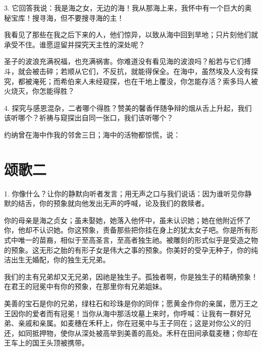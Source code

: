 3. 它回答我说：我是海之女，无边的海！我从那海上来，我怀中有一个巨大的奥秘宝库！搜寻海，但不要搜寻海的主！\par

我看见了那些在我之后下来的人，他们惊异，以致从海中回到旱地；只片刻他们就承受不住。谁愿逗留并探究天主性的深处呢？\par

圣子的波浪充满祝福，也充满祸害。你难道没有看见海的波浪吗？船若与它们搏斗，就会被击碎；若顺从它们，不反抗，就能得保全。在海中，虽然埃及人没有探究，都被淹死；而希伯来人未经窥探，也在干地上覆没，你怎能存活？索多玛人被火烧灭，你怎能得胜？\par

\par

4. 探究与感恩混杂，二者哪个得胜？赞美的馨香伴随争辩的烟从舌上升起，我们该听哪个？祈祷与窥探出自同一张口，我们该听哪个？\par

约纳曾在海中作我的邻舍三日；海中的活物都惊慌，说：\par


\section{颂歌二}

1. 你像什么？让你的静默向听者发言；用无声之口与我们说话：因为谁听见你静默的结舌，你的预象就向他发出无声的呼喊，论及我们的救赎者。\par

你的母亲是海之贞女；虽未娶她，她落入他怀中，虽未认识她；她在他附近怀了你，他却不认识她。你这预象，责备那些把你挂在身上的犹太女子吧。你是所有形式中唯一的苗裔，相似于至高圣言，至高者独生祂。被雕刻的形式似乎是受造之物的预象。这无形之胎的有形子女是伟大之事的预象。你美好的受孕无种子，你的纯洁出生无婚配，你的独生无兄弟。\par

我们的主有兄弟却又无兄弟，因祂是独生子。孤独者啊，你是独生子的精确预象！在君王的冠冕中有你的预象，在那里你有兄弟姐妹。\par

美善的宝石是你的兄弟，绿柱石和珍珠是你的同伴；愿黄金作你的亲属，愿万王之王因你的爱者而有冠冕！当你从海中那活坟墓上来时，你呼喊：让我有一群好兄弟、亲戚和亲属。如麦穗在禾秆上，你在冠冕中与王子同在；这是对你公义的归还，如同抵押物，使你从深处被高举到美善的高处。禾秆在田间承载麦穗；你却在王车上的国王头顶被携带。\par

